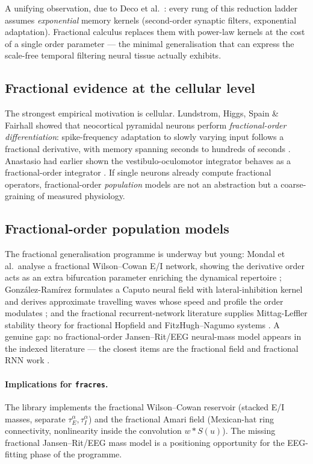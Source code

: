 \documentclass[11pt,a4paper]{article}
\begin{document}
A unifying observation, due to Deco et al.\ \cite{deco2008dynamic}: every rung
of this reduction ladder assumes \emph{exponential} memory kernels
(second-order synaptic filters, exponential adaptation). Fractional calculus
replaces them with power-law kernels at the cost of a single order parameter
--- the minimal generalisation that can express the scale-free temporal
filtering neural tissue actually exhibits.

\subsection{Fractional evidence at the cellular level}

The strongest empirical motivation is cellular. Lundstrom, Higgs, Spain \&
Fairhall showed that neocortical pyramidal neurons perform
\emph{fractional-order differentiation}: spike-frequency adaptation to slowly
varying input follows a fractional derivative, with memory spanning seconds to
hundreds of seconds \cite{lundstrom2008fractional}. Anastasio had earlier
shown the vestibulo-oculomotor integrator behaves as a fractional-order
integrator \cite{anastasio1994fractional}. If single neurons already compute
fractional operators, fractional-order \emph{population} models are not an
abstraction but a coarse-graining of measured physiology.

\subsection{Fractional-order population models}

The fractional generalisation programme is underway but young: Mondal et al.\
analyse a fractional Wilson--Cowan E/I network, showing the derivative order
acts as an extra bifurcation parameter enriching the dynamical repertoire
\cite{mondal2024emergent}; Gonz\'alez-Ram\'irez formulates a Caputo neural
field with lateral-inhibition kernel and derives approximate travelling waves
whose speed and profile the order modulates \cite{gonzalezramirez2022fractional};
and the fractional recurrent-network literature supplies Mittag-Leffler
stability theory for fractional Hopfield and FitzHugh--Nagumo systems
\cite{wang2014stability,brandibur2022stability}. A genuine gap: no
fractional-order Jansen--Rit/EEG neural-mass model appears in the indexed
literature --- the closest items are the fractional field
\cite{gonzalezramirez2022fractional} and fractional RNN work
\cite{wang2014stability}.

\paragraph{Implications for \texttt{fracres}.}
The library implements the fractional Wilson--Cowan reservoir (stacked E/I
masses, separate $\tau_E^\alpha, \tau_I^\alpha$) and the fractional Amari
field (Mexican-hat ring connectivity, nonlinearity inside the convolution
$w * S(u)$). The missing fractional Jansen--Rit/EEG mass model is a
positioning opportunity for the EEG-fitting phase of the programme.
\end{document}
